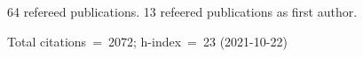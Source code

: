 64 refereed publications. 13 refeered publications as first author.

Total citations~=~2072; h-index~=~23 (2021-10-22)